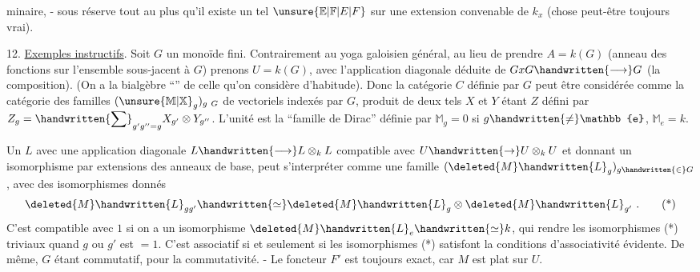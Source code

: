%
minaire, - sous réserve tout au plus qu'il existe un tel $\unsure{\mathbb{E}|\mathbb{F}|E|F}$ sur une extension convenable de $k_x$ (chose peut-être toujours vrai).

12. \uline{Exemples instructifs}. Soit $G$ un monoïde fini. Contrairement au yoga galoisien général, au lieu de prendre $A=k(G)$ (anneau des fonctions sur l'ensemble sous-jacent à $G$) prenons $U=k(G)$, avec l'application diagonale déduite de $GxG\handwritten{\longrightarrow}G$ (la composition). (On a la bialgèbre ``'' de celle qu'on considère d'habitude). Donc la catégorie $C$ définie par $G$  peut être considérée comme la catégorie des familles $(\unsure{\mathbb{M}|\mathbb{X}}_g)_{g\ G}$ de vectoriels indexés par $G$,  produit de deux tels $X$ et $Y$ étant $Z$ défini par $Z_g=\handwritten{\displaystyle\sum}_{g'g''=g}X_{g'}\otimes Y_{g''}$. L'unité est la ``famille de Dirac'' définie par $\mathbb{M}_g=0$ si $g\handwritten{\ne}\mathbb{e}$, $\mathbb{M}_e=k$.

Un $L$ avec une application diagonale $L\handwritten{\longrightarrow}L\otimes_k L$ compatible avec $U\handwritten{\to}U\otimes_k U$ et donnant un isomorphisme par extensions des anneaux de base, peut s'interpréter comme une famille $(\deleted{M}\handwritten{L}_g)_{g\handwritten{\in}G}$, avec des isomorphismes donnés
\[
\deleted{M}\handwritten{L}_{gg'}\handwritten{\simeq}\deleted{M}\handwritten{L}_g\otimes\deleted{M}\handwritten{L}_{g'}\ .
\tag*{(*)}
\]
C'est compatible avec $1$ si on a un isomorphisme\inserted{\handwritten{\unsure{(**)|(*+)}}} $\deleted{M}\handwritten{L}_e\handwritten{\simeq}k$, qui rendre les isomorphismes (*) triviaux quand  $g$ ou $g'$ est $=1$. C'est associatif si et seulement si les isomorphismes (*) satisfont la  conditions d'associativité évidente. De même, $G$ étant commutatif, pour la commutativité. - Le foncteur $F'$ est toujours exact, car $M$ est plat sur $U$.

